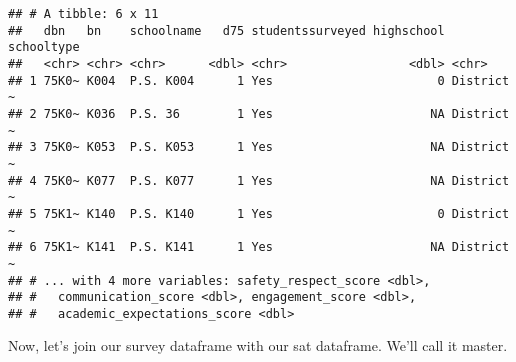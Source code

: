 \documentclass[]{article}
\newenvironment{Shaded}{\begin{snugshade}}{\end{snugshade}}
\newcommand{\DataTypeTok}[1]{\textcolor[rgb]{0.13,0.29,0.53}{#1}}
\newcommand{\DecValTok}[1]{\textcolor[rgb]{0.00,0.00,0.81}{#1}}
\newcommand{\KeywordTok}[1]{\textcolor[rgb]{0.13,0.29,0.53}{\textbf{#1}}}
\newcommand{\NormalTok}[1]{#1}
\newcommand{\OperatorTok}[1]{\textcolor[rgb]{0.81,0.36,0.00}{\textbf{#1}}}
\newcommand{\StringTok}[1]{\textcolor[rgb]{0.31,0.60,0.02}{#1}}
\begin{document}
\begin{verbatim}
## # A tibble: 6 x 11
##   dbn   bn    schoolname   d75 studentssurveyed highschool schooltype
##   <chr> <chr> <chr>      <dbl> <chr>                 <dbl> <chr>     
## 1 75K0~ K004  P.S. K004      1 Yes                       0 District ~
## 2 75K0~ K036  P.S. 36        1 Yes                      NA District ~
## 3 75K0~ K053  P.S. K053      1 Yes                      NA District ~
## 4 75K0~ K077  P.S. K077      1 Yes                      NA District ~
## 5 75K1~ K140  P.S. K140      1 Yes                       0 District ~
## 6 75K1~ K141  P.S. K141      1 Yes                      NA District ~
## # ... with 4 more variables: safety_respect_score <dbl>,
## #   communication_score <dbl>, engagement_score <dbl>,
## #   academic_expectations_score <dbl>
\end{verbatim}

Now, let's join our survey dataframe with our sat dataframe. We'll call
it master.

\begin{Shaded}
\end{Shaded}
\end{document}
